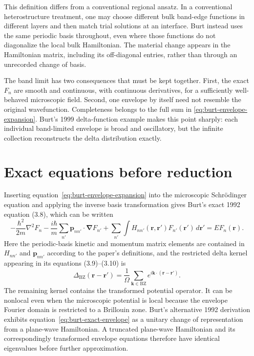 This definition differs from a conventional regional ansatz. In a conventional
heterostructure treatment, one may choose different bulk band-edge functions in
different layers and then match trial solutions at an interface. Burt instead
uses the same periodic basis throughout, even where those functions do not
diagonalize the local bulk Hamiltonian. The material change appears in the
Hamiltonian matrix, including its off-diagonal entries, rather than through an
unrecorded change of basis.

The band limit has two consequences that must be kept together. First, the exact
$F_n$ are smooth and continuous, with continuous derivatives, for a sufficiently
well-behaved microscopic field. Second, one envelope by itself need not resemble
the original wavefunction. Completeness belongs to the full sum in
\eqref{eq:burt-envelope-expansion}. Burt's 1999 delta-function example makes this
point sharply: each individual band-limited envelope is broad and oscillatory,
but the infinite collection reconstructs the delta distribution exactly.

\section{Exact equations before reduction}

Inserting equation~\eqref{eq:burt-envelope-expansion} into the microscopic
Schr\"odinger equation and applying the inverse basis transformation gives
Burt's exact 1992 equation (3.8), which can be written
\begin{equation}
  -\frac{\hbar^2}{2m}\nabla^2F_n
  -\frac{i\hbar}{m}\sum_{n'}
    \mathbf p_{nn'}\mathbin{\cdot}\boldsymbol\nabla F_{n'}
  +\sum_{n'}\int
    H_{nn'}(\mathbf r,\mathbf r')F_{n'}(\mathbf r')
    \,d\mathbf r'
  =
  E F_n(\mathbf r).
  \label{eq:burt-exact-envelope}
\end{equation}
Here the periodic-basis kinetic and momentum matrix elements are contained in
$H_{nn'}$ and $\mathbf p_{nn'}$ according to the paper's definitions, and the
restricted delta kernel appearing in its equations (3.9)--(3.10) is
\begin{equation}
  \Delta_{\mathrm{BZ}}(\mathbf r-\mathbf r')
  =
  \frac{1}{\Omega}
  \sum_{\mathbf k\in\mathrm{BZ}}
  e^{i\mathbf k\cdot(\mathbf r-\mathbf r')}.
  \label{eq:burt-restricted-delta}
\end{equation}
The remaining kernel contains the transformed potential operator. It can be
nonlocal even when the microscopic potential is local because the envelope
Fourier domain is restricted to a Brillouin zone. Burt's alternative 1992
derivation exhibits equation~\eqref{eq:burt-exact-envelope} as a unitary change
of representation from a plane-wave Hamiltonian. A truncated plane-wave
Hamiltonian and its correspondingly transformed envelope equations therefore
have identical eigenvalues before further approximation.

